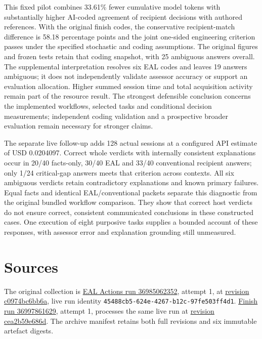 \documentclass[
  11pt,
]{article}
\begin{document}
This fixed pilot combines 33.61\% fewer cumulative model tokens with
substantially higher AI-coded agreement of recipient decisions with
authored references. With the original finish codes, the conservative
recipient-match difference is 58.18 percentage points and the joint
one-sided engineering criterion passes under the specified stochastic
and coding assumptions. The original figures and frozen tests retain
that coding snapshot, with 25 ambiguous answers overall. The
supplemental interpretation resolves six EAL codes and leaves 19 answers
ambiguous; it does not independently validate assessor accuracy or
support an evaluation allocation. Higher summed session time and total
acquisition activity remain part of the resource result. The strongest
defensible conclusion concerns the implemented workflows, selected tasks
and conditional decision measurements; independent coding validation and
a prospective broader evaluation remain necessary for stronger claims.

The separate live follow-up adds 128 actual sessions at a configured API
estimate of USD 0.0204097. Correct whole verdicts with internally
consistent explanations occur in 20/40 facts-only, 30/40 EAL and 33/40
conventional recipient answers; only 1/24 critical-gap answers meets
that criterion across contexts. All six ambiguous verdicts retain
contradictory explanations and known primary failures. Equal facts and
identical EAL/conventional packets separate this diagnostic from the
original bundled workflow comparison. They show that correct host
verdicts do not ensure correct, consistent communicated conclusions in
these constructed cases. One execution of eight purposive tasks supplies
a bounded account of these responses, with assessor error and
explanation grounding still unmeasured.

\FloatBarrier

\hypertarget{sources}{%
\section{Sources}\label{sources}}

The original collection is
\href{https://github.com/emmett08/earl/actions/runs/36985062352}{EAL
Actions run 36985062352}, attempt 1, at
\href{https://github.com/emmett08/earl/commit/c0974bc6bb6a2df30d1423b6248bfc51b4d2a9d7}{revision
c0974bc6bb6a}, live run identity
\texttt{45488cb5-624e-4267-b12c-97fe503ff4d1}.
\href{https://github.com/emmett08/earl/actions/runs/36997861629}{Finish
run 36997861629}, attempt 1, processes the same live run at
\href{https://github.com/emmett08/earl/commit/cea2b59e686d57e0c071924f184b497919ec91a7}{revision
cea2b59e686d}. The archive manifest retains both full revisions and six
immutable artefact digests.
\end{document}
